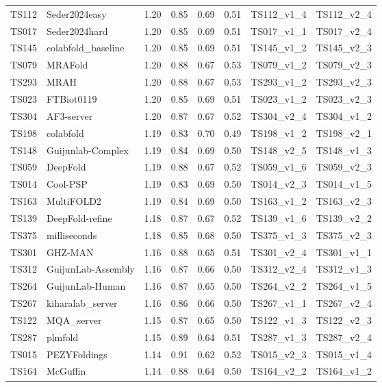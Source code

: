 \begin{table}[ht]
{\begin{tabular}{llllllll}
TS112 & Seder2024easy & 1.20 & 0.85 & 0.69 & 0.51 & TS112\_v1\_4 & TS112\_v2\_4 \\ 
TS017 & Seder2024hard & 1.20 & 0.85 & 0.69 & 0.51 & TS017\_v1\_1 & TS017\_v2\_4 \\ 
TS145 & colabfold\_baseline & 1.20 & 0.85 & 0.69 & 0.51 & TS145\_v1\_2 & TS145\_v2\_3 \\ 
TS079 & MRAFold & 1.20 & 0.88 & 0.67 & 0.53 & TS079\_v1\_2 & TS079\_v2\_3 \\ 
TS293 & MRAH & 1.20 & 0.88 & 0.67 & 0.53 & TS293\_v1\_2 & TS293\_v2\_3 \\ 
TS023 & FTBiot0119 & 1.20 & 0.85 & 0.69 & 0.51 & TS023\_v1\_2 & TS023\_v2\_3 \\ 
TS304 & AF3-server & 1.20 & 0.87 & 0.67 & 0.52 & TS304\_v2\_4 & TS304\_v1\_2 \\ 
TS198 & colabfold & 1.19 & 0.83 & 0.70 & 0.49 & TS198\_v1\_2 & TS198\_v2\_1 \\ 
TS148 & Guijunlab-Complex & 1.19 & 0.84 & 0.69 & 0.50 & TS148\_v2\_5 & TS148\_v1\_3 \\ 
TS059 & DeepFold & 1.19 & 0.88 & 0.67 & 0.52 & TS059\_v1\_6 & TS059\_v2\_3 \\ 
TS014 & Cool-PSP & 1.19 & 0.83 & 0.69 & 0.50 & TS014\_v2\_3 & TS014\_v1\_5 \\ 
TS163 & MultiFOLD2 & 1.19 & 0.84 & 0.69 & 0.50 & TS163\_v1\_2 & TS163\_v2\_3 \\ 
TS139 & DeepFold-refine & 1.18 & 0.87 & 0.67 & 0.52 & TS139\_v1\_6 & TS139\_v2\_2 \\ 
TS375 & milliseconds & 1.18 & 0.85 & 0.68 & 0.50 & TS375\_v1\_3 & TS375\_v2\_3 \\ 
TS301 & GHZ-MAN & 1.16 & 0.88 & 0.65 & 0.51 & TS301\_v2\_4 & TS301\_v1\_1 \\ 
TS312 & GuijunLab-Assembly & 1.16 & 0.87 & 0.66 & 0.50 & TS312\_v2\_4 & TS312\_v1\_3 \\ 
TS264 & GuijunLab-Human & 1.16 & 0.87 & 0.65 & 0.50 & TS264\_v2\_2 & TS264\_v1\_5 \\ 
TS267 & kiharalab\_server & 1.16 & 0.86 & 0.66 & 0.50 & TS267\_v1\_1 & TS267\_v2\_4 \\ 
TS122 & MQA\_server & 1.15 & 0.87 & 0.65 & 0.50 & TS122\_v1\_3 & TS122\_v2\_3 \\ 
TS287 & plmfold & 1.15 & 0.89 & 0.64 & 0.51 & TS287\_v1\_3 & TS287\_v2\_4 \\ 
TS015 & PEZYFoldings & 1.14 & 0.91 & 0.62 & 0.52 & TS015\_v2\_3 & TS015\_v1\_4 \\ 
TS164 & McGuffin & 1.14 & 0.88 & 0.64 & 0.50 & TS164\_v2\_2 & TS164\_v1\_2 \\ 

\end{tabular}}
\end{table}
